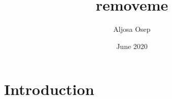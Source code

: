 \documentclass{article}
\title{removeme}
\author{Aljosa Osep}
\date{June 2020}
\begin{document}
\maketitle

\section{Introduction}


\cite{stemseg_arxiv20}
\cite{Gross193DV}
\cite{Voigtlaender19CVPR_MOTS}
\cite{Osep20ICRA}
\cite{Osep19ICRA}
\cite{Osep18ICRA}
\cite{Osep17ICRA}
\cite{Klostermann16BMVC}
\cite{Kochanov16IROS}
\cite{Osep16ICRA}
\cite{Mitzel15ICRA}
\cite{Weinmann13ICCV}
\cite{Weinmann12BMVC}



\end{document}
